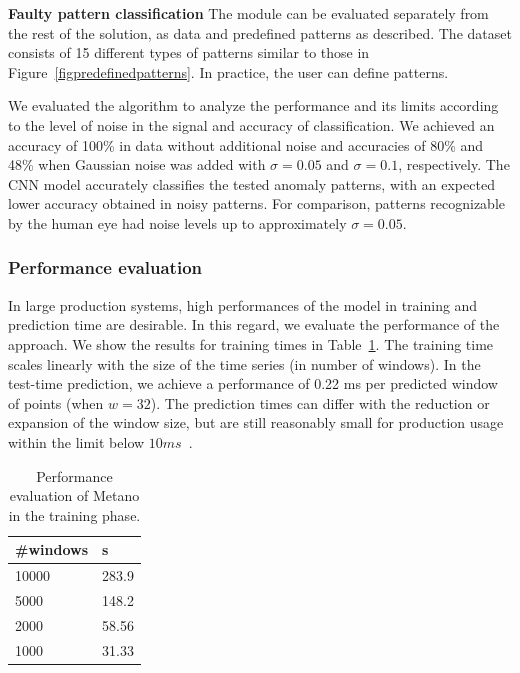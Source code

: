 
\textbf{Faulty pattern classification}\label{resultspr}
The module can be evaluated separately from the rest of the solution, as data and predefined patterns as described. 
The dataset consists of 15 different types of patterns similar to those in Figure~\ref{figpredefinedpatterns}. In practice, the user can define patterns.

We evaluated the algorithm to analyze the performance and its limits according to the level of noise in the signal and  accuracy of classification. We achieved an accuracy of 100\% in data without additional noise and accuracies of 80\% and 48\% when Gaussian noise was added with $\sigma=0.05$ and $\sigma=0.1$, respectively. The CNN model accurately classifies the tested anomaly patterns, with an expected lower accuracy obtained in noisy patterns. For comparison, patterns recognizable by the human eye had noise levels up to approximately $\sigma=0.05$.

\subsubsection{Performance evaluation}
In large production systems, high performances of the model in training and prediction time are desirable. In this regard, we evaluate the performance of the approach. We show the results for training times in Table~\ref{perf_table1}. The training time scales linearly with the size of the time series (in number of windows). In the test-time prediction, we achieve a performance of 0.22 ms per predicted window of points (when $w=32$). The prediction times can differ with the reduction or expansion of the window size, but are still reasonably small for production usage within the limit below $10 ms$~\cite{nedelkoski2019anomaly}.

\begin{table}[htbp]
\centering
\caption{Performance evaluation of Metano in the training phase.}
\label{perf_table1}
\begin{tabular}{ ll}
\hline
\#windows  &s\\ \hline
10000	&283.9\\
5000    &148.2\\
2000	&58.56\\
1000	&31.33\\ \hline
\end{tabular}
\end{table}


